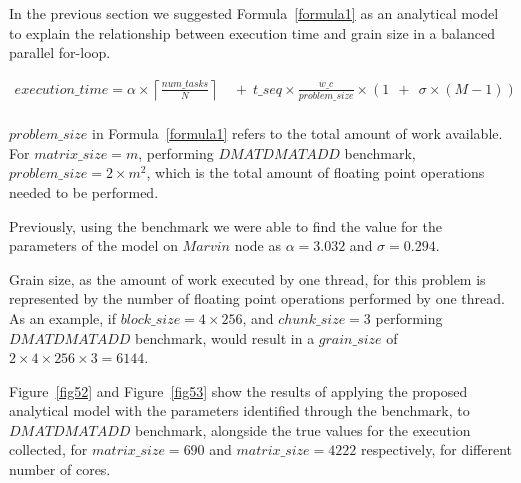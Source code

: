 In the previous section we suggested Formula~\ref{formula1} as an analytical model to explain the relationship between execution time and grain size in a balanced parallel for-loop.    

\begin{equation}
\begin{aligned}
execution\_time = 
\alpha\times{\left\lceil{\frac{num\_{tasks}}{N}}\right\rceil}\:\:&+\:\:t\_{seq}\times{\frac{w\_c}{problem\_{size}}}\times{(1\:\:+\:\:\sigma\times{(M-1)})}\:\:\\
\end{aligned}
\end{equation}

$problem\_{size}$ in Formula~\ref{formula1} refers to the total amount of work available. For $matrix\_{size}=m$, performing $DMATDMATADD$ benchmark, $problem\_{size}=2\times{m^2}$, which is the total amount of floating point operations needed to be performed.
 
Previously, using the benchmark we were able to find the value for the parameters of the model on $Marvin$ node as $\alpha=3.032$ and $\sigma=0.294$. 

Grain size, as the amount of work executed by one thread, for this problem is represented by the number of floating point operations performed by one thread. As an example, if $block\_{size}=4\times{256}$, and $chunk\_{size}=3$ performing $DMATDMATADD$ benchmark, would result in a $grain\_{size}$ of $2\times{4\times{256}\times{3}}=6144$. 

Figure~\ref{fig52} and Figure~\ref{fig53} show the results of applying the proposed analytical model with the parameters identified through the benchmark, to $DMATDMATADD$ benchmark, alongside the true values for the execution collected, for $matrix\_{size}=690$ and $matrix\_{size}=4222$ respectively, for different number of cores. 


